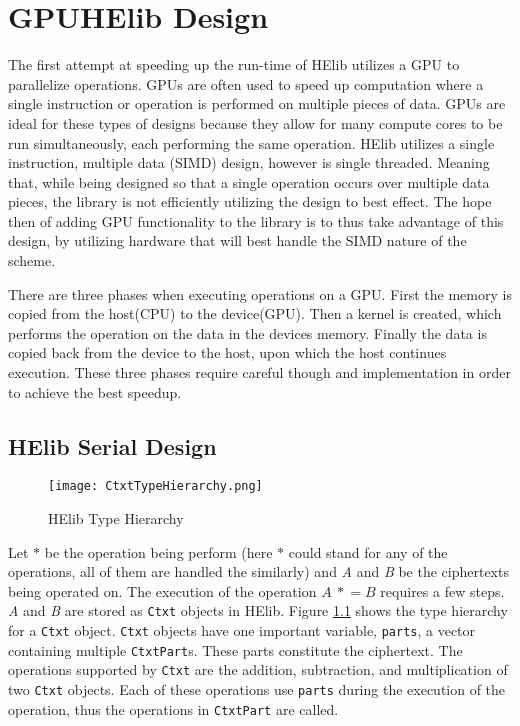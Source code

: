 \chapter{GPUHElib Design} \label{chap:GPUHElibDesign}
The first attempt at speeding up the run-time of HElib utilizes a GPU to parallelize operations. GPUs are often used to speed up computation where a single instruction or operation is performed on multiple pieces of data. GPUs are ideal for these types of designs because they allow for many compute cores to be run simultaneously, each performing the same operation. HElib utilizes a single instruction, multiple data (SIMD) design, however is single threaded. Meaning that, while being designed so that a single operation occurs over multiple data pieces, the library is not efficiently utilizing the design to best effect. The hope then of adding GPU functionality to the library is to thus take advantage of this design, by utilizing hardware that will best handle the SIMD nature of the scheme. 

There are three phases when executing operations on a GPU. First the memory is copied from the host(CPU) to the device(GPU). Then a kernel is created, which performs the operation on the data in the devices memory. Finally the data is copied back from the device to the host, upon which the host continues execution. These three phases require careful though and implementation in order to achieve the best speedup. 

\section{HElib Serial Design} \label{sec:HElibSerialDesign}

\begin{figure}[htp]
\centering
\texttt{[image: CtxtTypeHierarchy.png]}
\caption{HElib Type Hierarchy}
\label{fig:CtxtTypeHierarchy}
\end{figure}

Let $\ast$ be the operation being perform (here $\ast$ could stand for any of the operations, all of them are handled the similarly) and \textit{A} and \textit{B} be the ciphertexts being operated on. The execution of the operation $A\ \ast\!= B$ requires a few steps. \textit{A} and \textit{B} are stored as \verb|Ctxt| objects in HElib. Figure \ref{fig:CtxtTypeHierarchy} shows the type hierarchy for a \verb|Ctxt| object. \verb|Ctxt| objects have one important variable, \verb|parts|, a vector containing multiple \verb|CtxtPart|s. These parts constitute the ciphertext. The operations supported by \verb|Ctxt| are the addition, subtraction, and multiplication of two \verb|Ctxt| objects. Each of these operations use \verb|parts| during the execution of the operation, thus the operations in \verb|CtxtPart| are called.

